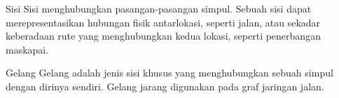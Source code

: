 \begin{definition}{Sisi}
Sisi menghubungkan pasangan-pasangan simpul.  Sebuah sisi dapat merepresentasikan hubungan fisik antarlokasi, seperti jalan, atau sekadar keberadaan rute yang menghubungkan kedua lokasi, seperti penerbangan maskapai.
\end{definition}

\begin{definition}{Gelang}
Gelang adalah jenis sisi khusus yang menghubungkan sebuah simpul dengan dirinya sendiri.  Gelang jarang digunakan pada graf jaringan jalan.\\

\par{}\label{fig:graphtheory-dor1-tikz05}%

 \end{definition}


